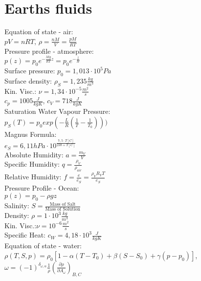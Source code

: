 \section*{Earths fluids}
Equation of state - air:\\
$pV=nRT$, $\rho = \frac{nM}{V}=\frac{pM}{RT}$\\
Pressure profile - atmosphere:\\
$p(z)=p_0 e^{-\frac{Mg}{RT}z}=p_0 e^{-\frac{z}{H}}$\\
Surface pressure: $p_0=1,013\cdot10^{5}Pa$\\
Surface density: $\rho_S = 1,235\frac{kg}{m^3}$\\
Kin. Visc.: $\nu=1,34\cdot10^{-5}\frac{m^2}{s}$\\
$c_p=1005\frac{J}{kgK}$, $c_V=718\frac{J}{kgK}$\\
Saturation Water Vapour Pressure:\\
$p_S(T)=p_0exp(-\frac{L}{R}(\frac{1}{T}-\frac{1}{T_0})))$\\
Magnus Formula:\\
$e_S=6,11hPa\cdot10^{\frac{7,5\cdot T[C]}{238 + T[C]}}$\\
Absolute Humidity: $a=\frac{m_V}{V}$\\
Specific Humidity: $q=\frac{\rho_V}{\rho_{air}}$\\
Relative Humidity: $f=\frac{e}{e_S}=\frac{\rho_V R_V T}{e_S}$\\
Pressure Profile - Ocean:\\
$p(z)=p_0-\rho g z$\\
Salinity: $S=\frac{\text{Mass of Salt}}{\text{Mass of Solution}}$\\
Density: $\rho=1\cdot10^3\frac{kg}{m^3}$\\
Kin. Visc.:$\nu=10^{-6}\frac{m^2}{s}$\\
Specific Heat: $c_W=4,18\cdot10^3\frac{J}{kgK}$\\
Equation of state - water:\\
$\rho(T,S,p)=\rho_0[1-\alpha(T-T_0)+\beta(S-S_0)+\gamma(p-p_0)]$, $\omega=(-1)^{\delta_{\omega,\alpha}}\frac{1}{\rho}\left(\frac{\partial \rho}{\partial A_\omega}\right)_{B,C}$

